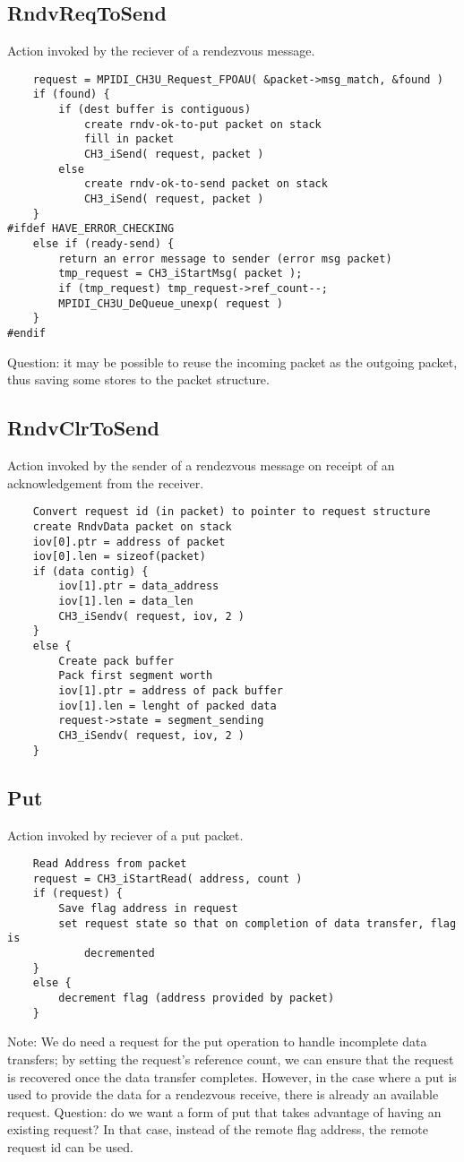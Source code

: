 \documentclass{article}
\begin{document}
\subsection{RndvReqToSend}
Action invoked by the reciever of a rendezvous message.
\begin{verbatim}
    request = MPIDI_CH3U_Request_FPOAU( &packet->msg_match, &found )
    if (found) {
        if (dest buffer is contiguous)
            create rndv-ok-to-put packet on stack
            fill in packet
            CH3_iSend( request, packet )
        else
            create rndv-ok-to-send packet on stack
            CH3_iSend( request, packet )
    }
#ifdef HAVE_ERROR_CHECKING
    else if (ready-send) {
        return an error message to sender (error msg packet)
        tmp_request = CH3_iStartMsg( packet );
        if (tmp_request) tmp_request->ref_count--;
        MPIDI_CH3U_DeQueue_unexp( request )
    }
#endif
\end{verbatim}
Question: it may be possible to reuse the incoming packet as the
outgoing packet, thus saving some stores to the packet structure.

\subsection{RndvClrToSend}
Action invoked by the sender of a rendezvous message on receipt of an
acknowledgement from the receiver.
\begin{verbatim}
    Convert request id (in packet) to pointer to request structure
    create RndvData packet on stack
    iov[0].ptr = address of packet
    iov[0].len = sizeof(packet)
    if (data contig) {
        iov[1].ptr = data_address
        iov[1].len = data_len
        CH3_iSendv( request, iov, 2 )
    }
    else {
        Create pack buffer
        Pack first segment worth
        iov[1].ptr = address of pack buffer
        iov[1].len = lenght of packed data
        request->state = segment_sending
        CH3_iSendv( request, iov, 2 )
    }
\end{verbatim}

\subsection{Put}
Action invoked by reciever of a put packet.  
\begin{verbatim}
    Read Address from packet
    request = CH3_iStartRead( address, count )
    if (request) {
        Save flag address in request
        set request state so that on completion of data transfer, flag is
            decremented
    }
    else {
        decrement flag (address provided by packet)
    }
\end{verbatim}
Note: We do need a request for the put operation to handle incomplete
data transfers; by setting the 
request's reference count, we can ensure that the request is recovered once
the data transfer completes.  However, in the case where a put is used to
provide the data for a rendezvous receive, there is already an available
request.  Question: do we want a form of put that takes advantage of having an
existing request?  In that case, instead of the remote flag address, the
remote request id can be used.
\end{document}
